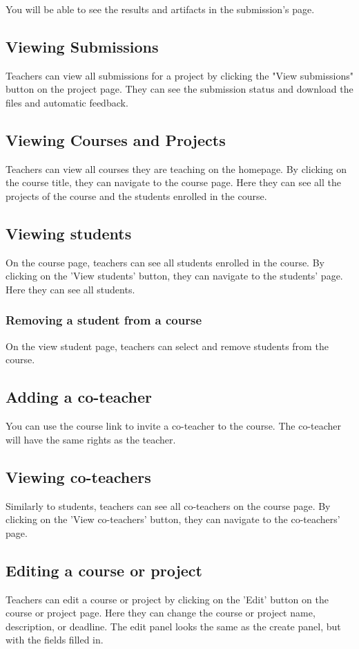 \documentclass{article}
\begin{document}
You will be able to see the results and artifacts in the submission's page.

\subsection{Viewing Submissions}
Teachers can view all submissions for a project by clicking the "View submissions" button on the project page. They can see the submission status and download the files and automatic feedback.

\subsection{Viewing Courses and Projects}
Teachers can view all courses they are teaching on the homepage. By clicking on the course title, they can navigate to the course page. Here they can see all the projects of the course and the students enrolled in the course.

\subsection{Viewing students}
On the course page, teachers can see all students enrolled in the course. By clicking on the 'View students' button, they can navigate to the students' page. Here they can see all students.

\subsubsection{Removing a student from a course} 
On the view student page, teachers can select and remove students from the course.

\subsection{Adding a co-teacher}
You can use the course link to invite a co-teacher to the course. The co-teacher will have the same rights as the teacher.

\subsection{Viewing co-teachers}
Similarly to students, teachers can see all co-teachers on the course page. By clicking on the 'View co-teachers' button, they can navigate to the co-teachers' page.

\subsection{Editing a course or project}
Teachers can edit a course or project by clicking on the 'Edit' button on the course or project page. Here they can change the course or project name, description, or deadline. The edit panel looks the same as the create panel, but with the fields filled in.
\end{document}
